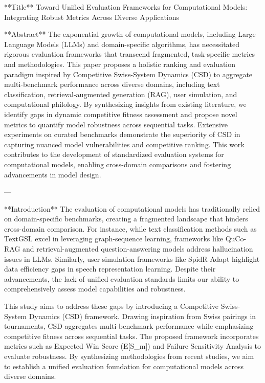 **Title**  
Toward Unified Evaluation Frameworks for Computational Models: Integrating Robust Metrics Across Diverse Applications  

**Abstract**  
The exponential growth of computational models, including Large Language Models (LLMs) and domain-specific algorithms, has necessitated rigorous evaluation frameworks that transcend fragmented, task-specific metrics and methodologies. This paper proposes a holistic ranking and evaluation paradigm inspired by Competitive Swiss-System Dynamics (CSD) to aggregate multi-benchmark performance across diverse domains, including text classification, retrieval-augmented generation (RAG), user simulation, and computational philology. By synthesizing insights from existing literature, we identify gaps in dynamic competitive fitness assessment and propose novel metrics to quantify model robustness across sequential tasks. Extensive experiments on curated benchmarks demonstrate the superiority of CSD in capturing nuanced model vulnerabilities and competitive ranking. This work contributes to the development of standardized evaluation systems for computational models, enabling cross-domain comparisons and fostering advancements in model design.  

---

**Introduction**  
The evaluation of computational models has traditionally relied on domain-specific benchmarks, creating a fragmented landscape that hinders cross-domain comparison. For instance, while text classification methods such as TextGSL excel in leveraging graph-sequence learning, frameworks like QuCo-RAG and retrieval-augmented question-answering models address hallucination issues in LLMs. Similarly, user simulation frameworks like SpidR-Adapt highlight data efficiency gaps in speech representation learning. Despite their advancements, the lack of unified evaluation standards limits our ability to comprehensively assess model capabilities and robustness.  

This study aims to address these gaps by introducing a Competitive Swiss-System Dynamics (CSD) framework. Drawing inspiration from Swiss pairings in tournaments, CSD aggregates multi-benchmark performance while emphasizing competitive fitness across sequential tasks. The proposed framework incorporates metrics such as Expected Win Score (E[S_m]) and Failure Sensitivity Analysis to evaluate robustness. By synthesizing methodologies from recent studies, we aim to establish a unified evaluation foundation for computational models across diverse domains.  

